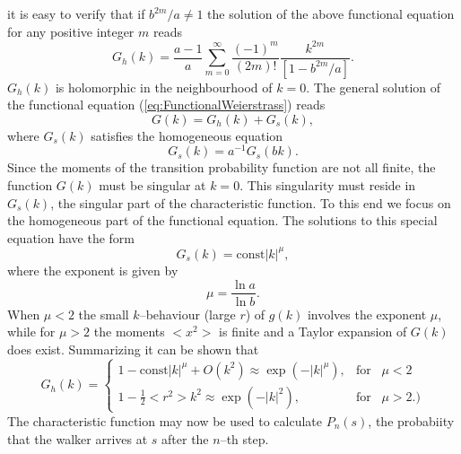 it is easy to verify that if $b^{2m}/a \ne 1$ the solution of the above
functional equation for  any positive integer $m$ reads
\begin{displaymath}
  G_h(k) = \frac{a-1}{a} \sum_{m=0}^{\infty} 
           \frac{(-1)^m}{(2m)!} \frac{k^{2m}}{[1-b^{2m}/a]}.
\end{displaymath}
$G_h(k)$ is holomorphic in the neighbourhood of $k=0$. The general solution of 
the functional equation (\ref{eq:FunctionalWeierstrass})
reads \cite{Hughes} \begin{displaymath}
  G(k) = G_h(k) + G_s(k),
\end{displaymath}
where $G_s(k)$ satisfies the homogeneous equation
\begin{displaymath}
 G_s(k) = a^{-1} G_s(bk). 
\end{displaymath}
Since the moments of the transition probability function are not all finite,
the function $G(k)$ must be singular at $k=0$. This singularity must reside in
$G_s(k)$, the singular part of the characteristic function.
To this end we focus on the homogeneous part of the functional equation. 
The solutions to this special equation have the form
\begin{displaymath}
  G_s(k) = \mbox{const} |k|^{\mu},
\end{displaymath}
where the exponent is given by
\begin{displaymath}
  \mu = \frac{\ln a}{\ln b}.
\end{displaymath}
When $\mu <2$ the small $k$--behaviour (large $r$) of $g(k)$ involves the
exponent $\mu$, while for $\mu >2$ the moments $<x^2>$ is finite and a Taylor
expansion of $G(k)$ does exist. Summarizing
it can be shown that
\begin{equation}
G_h(k) = \left\{
         \begin{array}{ll}
          1 - \mbox{const} |k|^{\mu} + O(k^2) \approx \exp(-|k|^{\mu}), 
               & \mbox{for} \;\;\; \mu <2 \\
          1 - \frac{1}{2} <r^2> k^2 \approx \exp(-|k|^2), & 
                  \mbox{for} \;\;\; \mu >2.)
         \end{array}
         \right.
\end{equation}
The characteristic function may now be used to calculate $P_n(s)$, the
probabiity that the walker arrives at $s$  after the $n$--th step.

